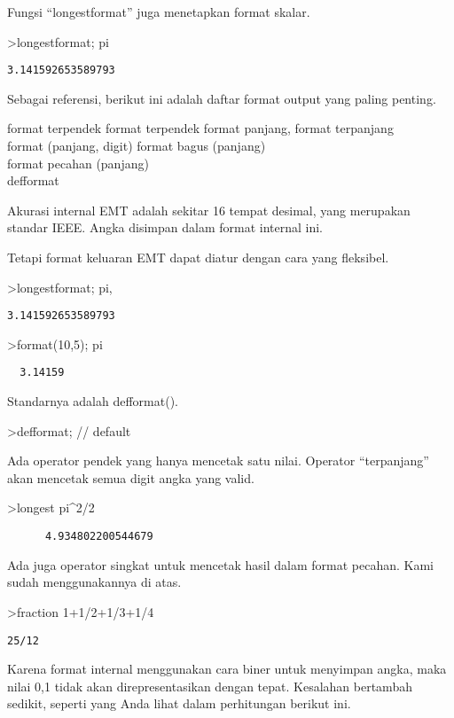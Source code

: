 \documentclass[
]{book}
\begin{document}
Fungsi ``longestformat'' juga menetapkan format skalar.

\textgreater longestformat; pi

\begin{verbatim}
3.141592653589793
\end{verbatim}

Sebagai referensi, berikut ini adalah daftar format output yang paling penting.

format terpendek format terpendek format panjang, format terpanjang\\
format (panjang, digit) format bagus (panjang)\\
format pecahan (panjang)\\
defformat

Akurasi internal EMT adalah sekitar 16 tempat desimal, yang merupakan standar IEEE. Angka disimpan dalam format internal ini.

Tetapi format keluaran EMT dapat diatur dengan cara yang fleksibel.

\textgreater longestformat; pi,

\begin{verbatim}
3.141592653589793
\end{verbatim}

\textgreater format(10,5); pi

\begin{verbatim}
  3.14159 
\end{verbatim}

Standarnya adalah defformat().

\textgreater defformat; // default

Ada operator pendek yang hanya mencetak satu nilai. Operator ``terpanjang'' akan mencetak semua digit angka yang valid.

\textgreater longest pi\^{}2/2

\begin{verbatim}
      4.934802200544679 
\end{verbatim}

Ada juga operator singkat untuk mencetak hasil dalam format pecahan. Kami sudah menggunakannya di atas.

\textgreater fraction 1+1/2+1/3+1/4

\begin{verbatim}
25/12
\end{verbatim}

Karena format internal menggunakan cara biner untuk menyimpan angka, maka nilai 0,1 tidak akan direpresentasikan dengan tepat. Kesalahan bertambah sedikit, seperti yang Anda lihat dalam perhitungan berikut ini.
\end{document}
